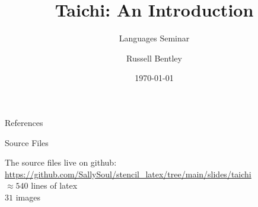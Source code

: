 \documentclass{beamer}[10pt]
\title{Taichi: An Introduction}
\subtitle{Languages Seminar}
\author{Russell Bentley}
\institute{Stony Brook}
\date{\today}
\begin{document}
\frame{\titlepage}



























\placelogofalse
\begin{frame}[allowframebreaks]{References}
    \tiny
    \printbibliography
\end{frame}
\placelogotrue

\begin{frame}{Source Files}
\begin{center}
  The source files live on github:\\
  \url{https://github.com/SallySoul/stencil_latex/tree/main/slides/taichi}\\
  $\approx 540$ lines of latex \\
  $31$ images
\end{center}
\end{frame}
\end{document}
